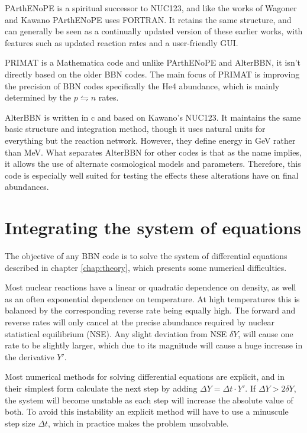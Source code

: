 PArthENoPE\cite{PArthENoPE} is a spiritual successor to NUC123, and like the works of Wagoner and Kawano PArthENoPE uses FORTRAN. It retains the same structure, and can generally be seen as a continually updated version of these earlier works, with features such as updated reaction rates and a user-friendly GUI.

PRIMAT\cite{PRIMAT} is a Mathematica code and unlike PArthENoPE and AlterBBN, it isn't directly based on the older BBN codes. The main focus of PRIMAT is improving the precision of BBN codes specifically the He4 abundance, which is mainly determined by the $p\leftrightharpoons n$ rates. 

AlterBBN is written in c and based on Kawano's NUC123. It maintains the same basic structure and integration method, though it uses natural units for everything but the reaction network. However, they define energy in GeV rather than MeV. What separates AlterBBN for other codes is that as the name implies, it allows the use of alternate cosmological models and parameters. Therefore, this code is especially well suited for testing the effects these alterations have on final abundances.


\section{Integrating the system of equations}
\label{sec:Solving}

The objective of any BBN code is to solve the system of differential equations described in chapter \ref{chap:theory}, which presents some numerical difficulties. 

Most nuclear reactions have a linear or quadratic dependence on density, as well as an often exponential dependence on temperature. At high temperatures this is balanced by the corresponding reverse rate being equally high. The forward and reverse rates will only cancel at the precise abundance required by nuclear statistical equilibrium (NSE). Any slight deviation from NSE $\delta Y$, will cause one rate to be slightly larger, which due to its magnitude will cause a huge increase in the derivative $Y'$.

Most numerical methods for solving differential equations are explicit, and in their simplest form calculate the next step by adding  $\Delta Y = \Delta t \cdot Y' $. 
If $\Delta Y>2\delta Y$, the system will become unstable as each step will increase the absolute value of both. To avoid this instability an explicit method will have to use a minuscule step size $\Delta t$, which in practice makes the problem unsolvable. 

